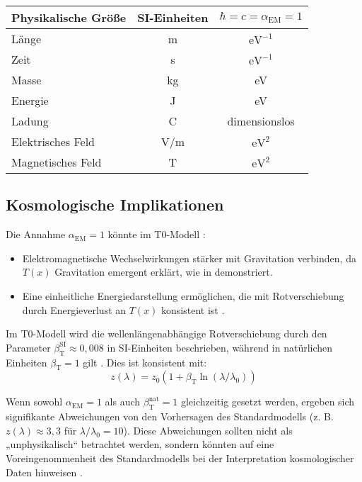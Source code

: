 \documentclass[12pt,a4paper]{article}
\newcommand{\Tfield}{T(x)}
\newcommand{\betaT}{\beta_{\text{T}}}
\newcommand{\alphaEM}{\alpha_{\text{EM}}}
\begin{document}
	\begin{center}
		\begin{tabular}{|l|c|c|}
			\hline
			\textbf{Physikalische Größe} & \textbf{SI-Einheiten} & \textbf{\(\hbar = c = \alphaEM = 1\)} \\
			\hline
			Länge & m & \(\text{eV}^{-1}\) \\
			Zeit & s & \(\text{eV}^{-1}\) \\
			Masse & kg & eV \\
			Energie & J & eV \\
			Ladung & C & dimensionslos \\
			Elektrisches Feld & V/m & \(\text{eV}^2\) \\
			Magnetisches Feld & T & \(\text{eV}^2\) \\
			\hline
		\end{tabular}
	\end{center}
	
	\subsection{Kosmologische Implikationen}
	\label{subsec:cosmological_implications}
	
	Die Annahme \(\alphaEM = 1\) könnte im T0-Modell \cite{pascher_galaxies_2025}:
	\begin{itemize}
		\item Elektromagnetische Wechselwirkungen stärker mit Gravitation verbinden, da \(\Tfield\) Gravitation emergent erklärt, wie in \cite{pascher_emergente_gravitation_2025} demonstriert.
		\item Eine einheitliche Energiedarstellung ermöglichen, die mit Rotverschiebung durch Energieverlust an \(\Tfield\) konsistent ist \cite{pascher_messdifferenzen_2025}.
	\end{itemize}
	
	Im T0-Modell wird die wellenlängenabhängige Rotverschiebung durch den Parameter \(\betaT^{\text{SI}} \approx 0,008\) in SI-Einheiten beschrieben, während in natürlichen Einheiten \(\betaT = 1\) gilt \cite{pascher_params_2025}. Dies ist konsistent mit:
	\begin{equation}
		\label{eq:wavelength_redshift}
		z(\lambda) = z_0 (1 + \betaT \ln(\lambda/\lambda_0))
	\end{equation}
	
	Wenn sowohl \(\alphaEM = 1\) als auch \(\betaT^{\text{nat}} = 1\) gleichzeitig gesetzt werden, ergeben sich signifikante Abweichungen von den Vorhersagen des Standardmodells (z. B. \(z(\lambda) \approx 3,3\) für \(\lambda/\lambda_0 = 10\)). Diese Abweichungen sollten nicht als „unphysikalisch“ betrachtet werden, sondern könnten auf eine Voreingenommenheit des Standardmodells bei der Interpretation kosmologischer Daten hinweisen \cite{pascher_alphabeta_2025}.
	
\end{document}
